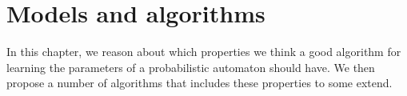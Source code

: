 \chapter{Models and algorithms}
In this chapter, we reason about which properties we think a good algorithm for learning the parameters of a probabilistic automaton should have.
We then propose a number of algorithms that includes these properties to some extend.






